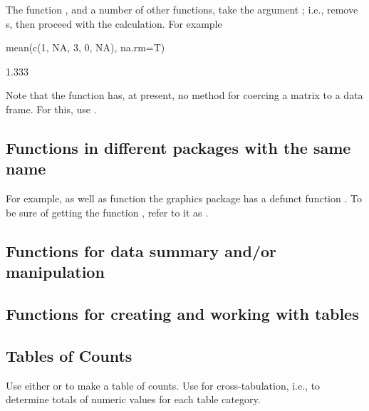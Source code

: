 The function , and a number of other functions, take the
argument ; i.e., remove s, then proceed with
the calculation. For example
\begin{Schunk}
\begin{Sinput}
mean(c(1, NA, 3, 0, NA), na.rm=T)
\end{Sinput}
\begin{Soutput}
[1] 1.333
\end{Soutput}
\end{Schunk}

Note that the function  has, at present, no method for
coercing a matrix to a data frame. For this, use
.

\subsection*{Functions in different packages with the same name}
For example, as well as  function 
the graphics package has a defunct function .
To be sure of getting the  function ,
refer to it as .


\subsection{Functions for data summary and/or manipulation}

\subsection{Functions for creating and working with tables}\label{sec:tab}

\subsection{Tables of Counts}

Use either  or  to make a table of
counts. Use  for cross-tabulation, i.e., to determine
totals of numeric values for each table category.


